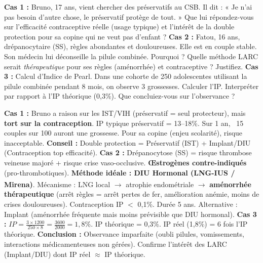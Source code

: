\documentclass[11pt]{article}
\begin{document}
\begin{exercice}
\textbf{Cas 1 :} Bruno, 17 ans, vient chercher des préservatifs au CSB. Il dit : « Je n'ai pas besoin d'autre chose, le préservatif protège de tout. » Que lui répondez-vous sur l'efficacité contraceptive réelle (usage typique) et l'intérêt de la double protection pour sa copine qui ne veut pas d'enfant ?
\vspace{0.5cm}
\textbf{Cas 2 :} Fatou, 16 ans, drépanocytaire (SS), règles abondantes et douloureuses. Elle est en couple stable. Son médecin lui déconseille la pilule combinée. Pourquoi ? Quelle méthode LARC serait \emph{thérapeutique} pour ses règles (aménorrhée) et contraceptive ? Justifiez.
\vspace{0.5cm}
\textbf{Cas 3 :} Calcul d'Indice de Pearl. Dans une cohorte de 250 adolescentes utilisant la pilule combinée pendant 8 mois, on observe 3 grossesses. Calculer l'IP. Interpréter par rapport à l'IP théorique (0,3\%). Que concluiez-vous sur l'observance ?
\end{exercice}

\begin{corrige}
\textbf{Cas 1 :} Bruno a raison sur les IST/VIH (préservatif = seul protecteur), mais \textbf{tort sur la contraception}. IP typique préservatif = 13--18\%. Sur 1 an, ~15 couples sur 100 auront une grossesse. Pour sa copine (enjeu scolarité), risque inacceptable. \textbf{Conseil :} Double protection = Préservatif (IST) + Implant/DIU (Contraception top efficacité).
\vspace{0.3cm}
\textbf{Cas 2 :} Drépanocytose (SS) = risque thrombose veineuse majoré + risque crise vaso-occlusive. \textbf{Œstrogènes contre-indiqués} (pro-thrombotiques). \textbf{Méthode idéale : DIU Hormonal (LNG-IUS / Mirena\textsuperscript{\textregistered})}. Mécanisme : LNG local $\rightarrow$ atrophie endométriale $\rightarrow$ \textbf{aménorrhée thérapeutique} (arrêt règles = arrêt pertes de fer, amélioration anémie, moins de crises douloureuses). Contraception IP $<$ 0,1\%. Durée 5 ans. Alternative : Implant (aménorrhée fréquente mais moins prévisible que DIU hormonal).
\vspace{0.3cm}
\textbf{Cas 3 :} $IP = \frac{3 \times 1200}{250 \times 8} = \frac{3600}{2000} = 1,8\%$. IP théorique = 0,3\%. IP réel (1,8\%) = 6 fois l'IP théorique. \textbf{Conclusion :} Observance imparfaite (oubli pilules, vomissements, interactions médicamenteuses non gérées). Confirme l'intérêt des LARC (Implant/DIU) dont IP réel $\approx$ IP théorique.
\end{corrige}
\end{document}
